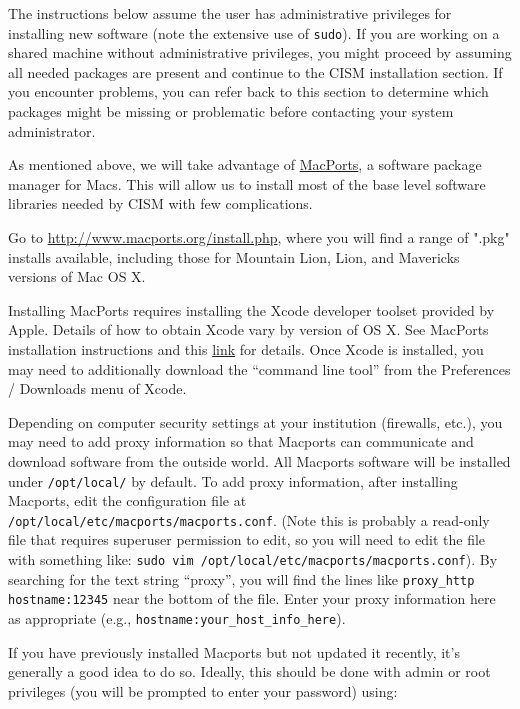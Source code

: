The instructions below assume the user has administrative privileges for
installing new software (note the extensive use of \texttt{sudo}).  
If you are working on a shared machine without
administrative privileges, you might proceed by assuming all needed packages are present and 
continue to the CISM installation section.  If you encounter problems, you can refer back to this
section to determine which packages might be missing or
problematic before contacting your system administrator.


\begin{mdframed}[style=mac] %
As mentioned above, we will take advantage of \href{http://www.macports.org/}{MacPorts}, 
a software package manager for Macs. This will allow us to install most of 
the base level software libraries needed by CISM with few complications. 

Go to \href{http://www.macports.org/install.php}{http://www.macports.org/install.php}, where you will find a range of ".pkg" installs available, including those for Mountain Lion, Lion, and Mavericks versions of Mac OS X. 

Installing MacPorts requires installing the Xcode developer toolset provided by Apple. Details of how to obtain Xcode vary by version of OS X. See MacPorts installation instructions and this \href{https://developer.apple.com/xcode/downloads/}{link} for details. Once Xcode is installed, you may need to additionally download the ``command line tool'' from the Preferences / Downloads menu of Xcode. 

Depending on computer security settings at your institution (firewalls, etc.), 
you may need to add proxy information so that Macports can communicate and 
download software from the outside world. All Macports software will be installed 
under \texttt{/opt/local/} by default. To add proxy information, after installing 
Macports, edit the configuration file at \texttt{/opt/local/etc/macports/macports.conf}.
(Note this is probably a read-only file that requires superuser permission to edit,
so you will need to edit the file with something like: \texttt{sudo vim /opt/local/etc/macports/macports.conf}). 
By searching for the text string ``proxy'', you will find the lines like 
\texttt{proxy\_http hostname:12345} near the bottom of the file. Enter your proxy 
information here as appropriate (e.g., \texttt{hostname:your\_host\_info\_here}).

If you have previously installed Macports but not updated it recently, it's generally a good idea to do so. Ideally, this should be done with admin or root privileges (you will be prompted to enter your password) using:


\end{mdframed}
